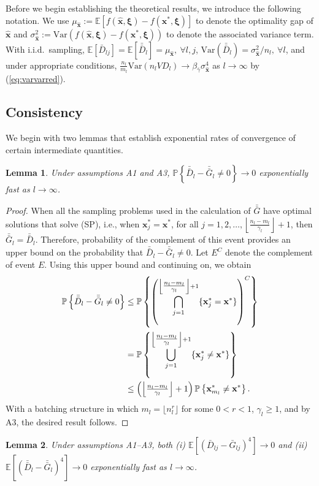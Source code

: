 \documentclass[12pt]{article}
\newtheorem{lemma}{Lemma}
\newcommand{\p}[1]{\mathbb{P} \left\{ #1 \right\}}
\newcommand{\e}[1]{\mathbb{E} \left[ #1 \right]
}
\newcommand{\var}[1]{\mathrm{Var} \left( #1 \right)}
\newcommand{\x}{\mathbf{x}}
\newcommand{\xh}{{\hat{\x}}}
\newcommand{\xs}{\x^*}
\newcommand{\xit}{\boldsymbol{\xi}}
\newcommand{\nbl}{\left\lfloor\tfrac{n_l-m_l}{\gamma_l}\right\rfloor+1}
\newcommand{\gammab}{\bar{\gamma}}
\newcommand{\gb}{\bar{G}}
\newcommand{\gbb}{\bar{\gb}}
\newcommand{\db}{\bar{D}}
\newcommand{\dbb}{\bar{\db}}
\begin{document}
Before we begin establishing the theoretical results, we introduce the following notation. 
We use $\mu_{\xh} := \e{f(\xh,\xit) - f(\xs,\xit)}$ to denote the optimality gap of $\xh$ and $\sigma^2_{\xh} := \var{f(\xh,\xit) - f(\xs,\xit)}$ to denote the associated variance term.
With i.i.d.\ sampling, $\e{\db_{lj}}=\e{\dbb_l}=\mu_{\xh}, \ \forall l,j$, $\var{\dbb_l}=\sigma^2_{\xh}/n_l, \ \forall l$, and under appropriate conditions, $\frac{n_l}{m_l} \var{n_l VD_l} \rightarrow \beta_{\gammab} \sigma^4_{\xh}$ as $l \rightarrow \infty$  by (\ref{eq:varvarred}). 


\subsection{Consistency}
\label{subsec:conv} 

We begin with two lemmas that establish exponential rates of convergence of certain intermediate quantities.

\begin{lemma} \label{lem:gbb_prob}
	Under assumptions A1 and A3, $\p{\dbb_l - \gbb_l \neq 0} \rightarrow 0$ exponentially fast as $l \rightarrow \infty$.
\end{lemma}

\begin{proof} When all the sampling problems used in the calculation of $\gbb$ have optimal solutions that solve (SP), i.e., when $\xs_{j} = \xs$, for all $j=1,2,\ldots, \nbl$, then $\gbb_l = \dbb_l$. 
Therefore, probability of the complement of this event provides an upper bound on the probability that $\dbb_l - \gbb_l \neq 0$. 
Let $E^C$ denote the complement of event $E$. 
Using this upper bound and continuing on, we obtain
	\begin{align}
		\p{\dbb_l - \gbb_l \neq 0} & \leq \p{\left( \bigcap_{j=1}^{\nbl} \{\xs_{j} = \xs\} \right)^C} \notag \\
		& = \p{ \bigcup_{j=1}^{\nbl} \{\xs_{j} \neq \xs\}} \notag \\
		& \leq \left( \nbl\right) \p{ \xs_{m_l} \neq \xs }. \notag
	\end{align}
	With a batching structure in which $m_l = \lfloor n_l^{r} \rfloor$ for some $0<r<1$,  $\gamma_l \geq 1$, and by A3, the desired result follows.
\end{proof}

\begin{lemma} \label{lem:gb_gbb_l4}
	Under assumptions A1--A3, both (i) $\e{(\db_{lj} - \gb_{lj})^4} \rightarrow 0$ and (ii) $\e{(\dbb_l - \gbb_l)^4} \rightarrow 0$ exponentially fast as $l \rightarrow \infty$.
\end{lemma}
\end{document}
